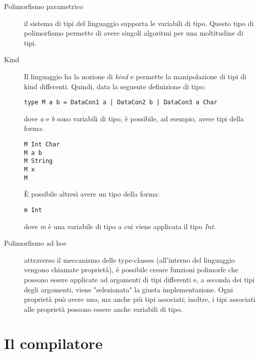 \documentclass[10pt,a4paper]{article}
\begin{document}
\begin{description}
\item[Polimorfismo parametrico] il sistema di tipi del linguaggio supporta le variabili di tipo. Questo tipo di
polimorfismo permette di avere singoli algoritmi per una moltitudine di tipi.
\item[Kind] Il linguaggio ha la nozione di \textit{kind} e permette la manipolazione di tipi di kind differenti.
Quindi, data la seguente definizione di tipo:
\begin{lstlisting}
type M a b = DataCon1 a | DataCon2 b | DataCon3 a Char
\end{lstlisting}
dove \textit{a} e \textit{b} sono variabili di tipo, è possibile, ad esempio, avere tipi della forma:
\begin{lstlisting}
M Int Char
M a b
M String
M x
M
\end{lstlisting}
\`E possibile altresì avere un tipo della forma:
\begin{lstlisting}
m Int
\end{lstlisting}
dove \textit{m} è una variabile di tipo a cui viene applicata il tipo \textit{Int}.
\item[Polimorfismo ad hoc] attraverso il meccanismo delle type-classes (all'interno del linguaggio vengono chiamate
proprietà), è possibile creare funzioni polimorfe che possono essere applicate ad argomenti di tipi differenti e, a
seconda dei tipi degli argomenti, viene "selezionata" la giusta implementazione. Ogni proprietà può avere uno, ma anche
più tipi associati; inoltre, i tipi associati alle proprietà possono essere anche variabili di tipo.

\end{description}

\section{Il compilatore}
\end{document}
